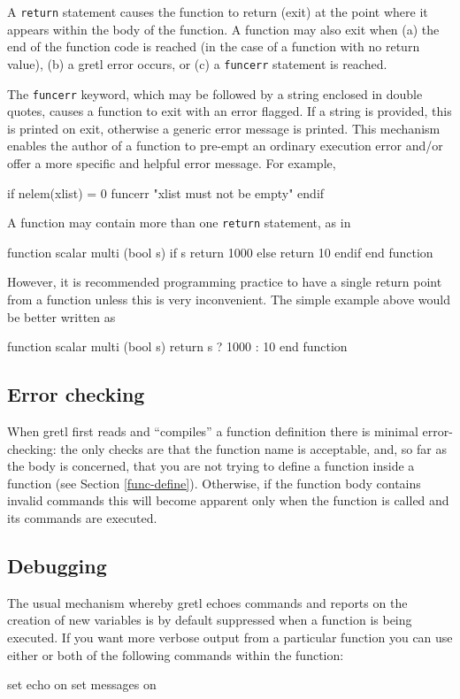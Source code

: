 A \texttt{return} statement causes the function to return (exit) at
the point where it appears within the body of the function.  A
function may also exit when (a) the end of the function code is
reached (in the case of a function with no return value), (b) a
gretl error occurs, or (c) a \verb+funcerr+ statement is
reached.

The \verb+funcerr+ keyword, which may be followed by a string enclosed
in double quotes, causes a function to exit with an error flagged.  If
a string is provided, this is printed on exit, otherwise a generic
error message is printed.  This mechanism enables the author of a
function to pre-empt an ordinary execution error and/or offer a more
specific and helpful error message.  For example,
%
\begin{code}
if nelem(xlist) = 0
   funcerr "xlist must not be empty"
endif
\end{code}

A function may contain more than one \texttt{return} statement, as in
%
\begin{code}
function scalar multi (bool s)
   if s
      return 1000
   else
      return 10
   endif
end function
\end{code}
%
However, it is recommended programming practice to have a single
return point from a function unless this is very inconvenient.  The
simple example above would be better written as
%
\begin{code}
function scalar multi (bool s)
   return s ? 1000 : 10
end function
\end{code}
    

\subsection{Error checking}

When gretl first reads and ``compiles'' a function definition there is
minimal error-checking: the only checks are that the function name is
acceptable, and, so far as the body is concerned, that you are not
trying to define a function inside a function (see Section
\ref{func-define}). Otherwise, if the function body contains invalid
commands this will become apparent only when the function is called
and its commands are executed.

\subsection{Debugging}

The usual mechanism whereby gretl echoes commands and reports on
the creation of new variables is by default suppressed when a function
is being executed.  If you want more verbose output from a particular
function you can use either or both of the following commands within
the function:
%
\begin{code}
set echo on
set messages on
\end{code}

